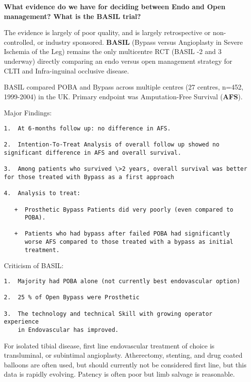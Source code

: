 \documentclass[
]{book}
\begin{document}
\textbf{What evidence do we have for deciding between Endo and Open management?
What is the BASIL trial?}

The evidence is largely of poor quality, and is largely retrospective or
non-controlled, or industry sponsored. \textbf{BASIL} (Bypass versus Angioplasty
in Severe Ischemia of the Leg) remains the only multicentre RCT (BASIL
-2 and 3 underway) directly comparing an endo versus open management
strategy for CLTI and Infra-inguinal occlusive disease.~

BASIL compared POBA and Bypass across multiple centres (27 centres,
n=452, 1999-2004) in the UK. Primary endpoint was Amputation-Free
Survival (\textbf{AFS}). \citep{bradburyBypassAngioplastySevere2005}

Major Findings:

\begin{verbatim}
1.  At 6-months follow up: no difference in AFS.

2.  Intention-To-Treat Analysis of overall follow up showed no
significant difference in AFS and overall survival.

3.  Among patients who survived \>2 years, overall survival was better
for those treated with Bypass as a first approach

4.  Analysis to treat: 

   +  Prosthetic Bypass Patients did very poorly (even compared to
      POBA). 

   +  Patients who had bypass after failed POBA had significantly
      worse AFS compared to those treated with a bypass as initial
      treatment.
\end{verbatim}

Criticism of BASIL:

\begin{verbatim}
1.  Majority had POBA alone (not currently best endovascular option)

2.  25 % of Open Bypass were Prosthetic

3.  The technology and technical Skill with growing operator experience
    in Endovascular has improved.
\end{verbatim}

For isolated tibial disease, first line endovascular treatment of choice
is transluminal, or subintimal angioplasty. Atherectomy, stenting, and
drug coated balloons are often used, but should currently not be considered
first line, but this data is rapidly evolving. Patency is often
poor but limb salvage is reasonable.\citep{popplewell2019, kayssi2016, mustapha2016}
\end{document}
